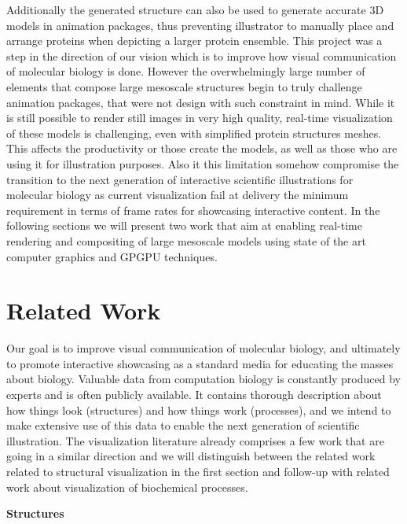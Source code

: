 Additionally the generated structure can also be used to generate accurate 3D models in animation packages, thus preventing illustrator to manually place and arrange proteins when depicting a larger protein ensemble.
This project was a step in the direction of our vision which is to improve how visual communication of molecular biology is done.
However the overwhelmingly large number of elements that compose large mesoscale structures begin to truly challenge animation packages, that were not design with such constraint in mind.
While it is still possible to render still images in very high quality, real-time visualization of these models is challenging, even with simplified protein structures meshes. 
This affects the productivity or those create the models, as well as those who are using it for illustration purposes.
Also it this limitation somehow compromise the transition to the next generation of interactive scientific illustrations for molecular biology as current visualization fail at delivery the minimum requirement in terms of frame rates for showcasing interactive content.
In the following sections we will present two work that aim at enabling real-time rendering and compositing of large mesoscale models using state of the art computer graphics and GPGPU techniques.

\section{Related Work}

Our goal is to improve visual communication of molecular biology, and ultimately to promote interactive showcasing as a standard media for educating the masses about biology.
Valuable data from computation biology is constantly produced by experts and is often publicly available. 
It contains thorough description about how things look (structures) and how things work (processes), and we intend to make extensive use of this data to enable the next generation of scientific illustration.
The visualization literature already comprises a few work that are going in a similar direction and we will distinguish between the related work related to structural visualization in the first section and follow-up with related work about visualization of biochemical processes.

\textbf{Structures}

